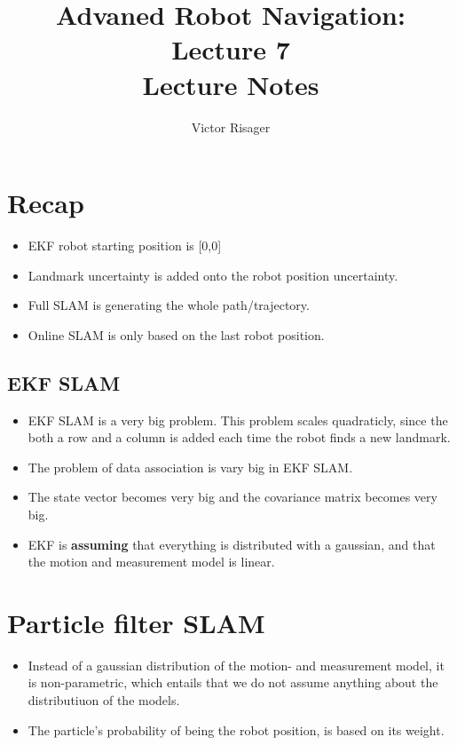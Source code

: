 \documentclass[a4paper]{article}
\title{Advaned Robot Navigation: Lecture 7 \\
	\large Lecture Notes}
\author{Victor Risager}
\begin{document}
\maketitle

\section{Recap}
\begin{itemize}
	\item EKF robot starting position is [0,0]
	\item Landmark uncertainty is added onto the robot position uncertainty.
	\item Full SLAM is generating the whole path/trajectory.
	\item Online SLAM is only based on the last robot position.

\end{itemize}

\subsection{EKF SLAM}
\begin{itemize}
	\item EKF SLAM is a very big problem. This problem scales quadraticly, since the both a row and a column is added each time the robot finds a new landmark. 
	\item The problem of data association is vary big in EKF SLAM.
	\item The state vector becomes very big and the covariance matrix becomes very big.
	\item EKF is \textbf{assuming} that everything is distributed with a gaussian, and that the motion and measurement model is linear.  
\end{itemize}

\section{Particle filter SLAM}
\begin{itemize}
	\item Instead of a gaussian distribution of the motion- and measurement model, it is non-parametric, which entails that we do not assume anything about the distributiuon of the models. 
	\item The particle's probability of being the robot position, is based on its weight.
\end{itemize}
\end{document}
